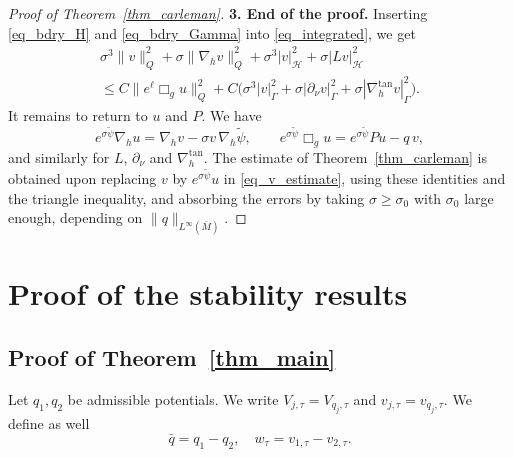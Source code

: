 \documentclass[12pt,reqno]{amsart}
\numberwithin{equation}{section}
\theoremstyle{definition}
\theoremstyle{plain}
\theoremstyle{definition}
\theoremstyle{definition}
\newcommand{\uu}{M}
\begin{document}
\begin{proof}[Proof of Theorem~\ref{thm_carleman}]
\medskip\noindent
\textbf{3. End of the proof.}
Inserting \eqref{eq_bdry_H} and \eqref{eq_bdry_Gamma} into \eqref{eq_integrated}, we get
\begin{multline}\label{eq_v_estimate}
\sigma^3\|v\|^2_Q+\sigma\|\nabla_h v\|^2_Q+\sigma^3|v|^2_{\mathcal H}+\sigma|Lv|^2_{\mathcal H}\\
\le C\|e^\ell\Box_gu\|^2_Q+C\bigl(\sigma^3|v|^2_\Gamma+\sigma|\partial_\nu v|^2_\Gamma+\sigma|\nabla_h^{\tan}v|^2_\Gamma\bigr).
\end{multline}
It remains to return to $u$ and $P$. We have
\[
e^{\sigma\tilde\psi}\nabla_h u=\nabla_h v-\sigma v\,\nabla_h\tilde\psi,
\qquad
e^{\sigma\tilde\psi}\Box_gu=e^{\sigma\tilde\psi}Pu-q\,v ,
\]
and similarly for $L$, $\partial_\nu$ and $\nabla_h^{\tan}$. The estimate of Theorem~\ref{thm_carleman} is obtained upon replacing $v$ by $e^{\sigma\tilde\psi}u$ in \eqref{eq_v_estimate}, using these identities and the triangle inequality, and absorbing the errors by taking $\sigma\ge\sigma_0$ with $\sigma_0$ large enough, depending on $\|q\|_{L^\infty(\overline\uu)}$.
\end{proof}



\section{Proof of the stability results}\label{sec_proof_main}




\subsection{Proof of Theorem~\ref{thm_main}}

Let $q_1,q_2$ be admissible potentials. We write $V_{j,\tau}=V_{q_j,\tau}$ and $v_{j,\tau}=v_{q_j,\tau}$. We define as well
\begin{equation}
   \bar q=q_1-q_2, \quad w_\tau=v_{1,\tau}-v_{2,\tau}.
\end{equation}
\end{document}
